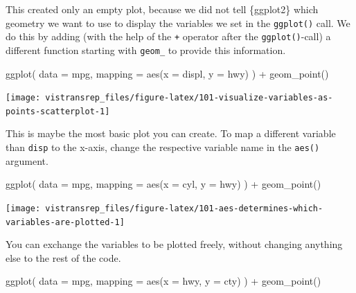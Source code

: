 \documentclass[]{book}
\newenvironment{Shaded}{}{}
\newcommand{\DataTypeTok}[1]{#1}
\newcommand{\KeywordTok}[1]{\textcolor[rgb]{0.00,0.00,1.00}{#1}}
\newcommand{\NormalTok}[1]{#1}
\newcommand{\OperatorTok}[1]{#1}
\newcommand{\StringTok}[1]{\textcolor[rgb]{0.00,0.50,0.50}{#1}}
\begin{document}
This created only an empty plot, because we did not tell \{ggplot2\} which geometry we want to use to display the variables we set in the \texttt{ggplot()} call.
We do this by adding (with the help of the \texttt{+} operator after the \texttt{ggplot()}-call) a different function starting with \texttt{geom\_} to provide this information.

\begin{Shaded}
\begin{Highlighting}[]
\KeywordTok{ggplot}\NormalTok{(}
  \DataTypeTok{data =}\NormalTok{ mpg,}
  \DataTypeTok{mapping =} \KeywordTok{aes}\NormalTok{(}\DataTypeTok{x =}\NormalTok{ displ, }\DataTypeTok{y =}\NormalTok{ hwy)}
\NormalTok{) }\OperatorTok{+}
\StringTok{  }\KeywordTok{geom_point}\NormalTok{()}
\end{Highlighting}
\end{Shaded}

\begin{flushright}\texttt{[image: vistransrep\_files/figure-latex/101-visualize-variables-as-points-scatterplot-1]} \end{flushright}

This is maybe the most basic plot you can create.
To map a different variable than \texttt{disp} to the x-axis, change the respective variable name in the \texttt{aes()} argument.

\begin{Shaded}
\begin{Highlighting}[]
\KeywordTok{ggplot}\NormalTok{(}
  \DataTypeTok{data =}\NormalTok{ mpg,}
  \DataTypeTok{mapping =} \KeywordTok{aes}\NormalTok{(}\DataTypeTok{x =}\NormalTok{ cyl, }\DataTypeTok{y =}\NormalTok{ hwy)}
\NormalTok{) }\OperatorTok{+}
\StringTok{  }\KeywordTok{geom_point}\NormalTok{()}
\end{Highlighting}
\end{Shaded}

\begin{flushright}\texttt{[image: vistransrep\_files/figure-latex/101-aes-determines-which-variables-are-plotted-1]} \end{flushright}

You can exchange the variables to be plotted freely, without changing anything else to the rest of the code.

\begin{Shaded}
\begin{Highlighting}[]
\KeywordTok{ggplot}\NormalTok{(}
  \DataTypeTok{data =}\NormalTok{ mpg,}
  \DataTypeTok{mapping =} \KeywordTok{aes}\NormalTok{(}\DataTypeTok{x =}\NormalTok{ hwy, }\DataTypeTok{y =}\NormalTok{ cty)}
\NormalTok{) }\OperatorTok{+}
\StringTok{  }\KeywordTok{geom_point}\NormalTok{()}
\end{Highlighting}
\end{Shaded}
\end{document}
